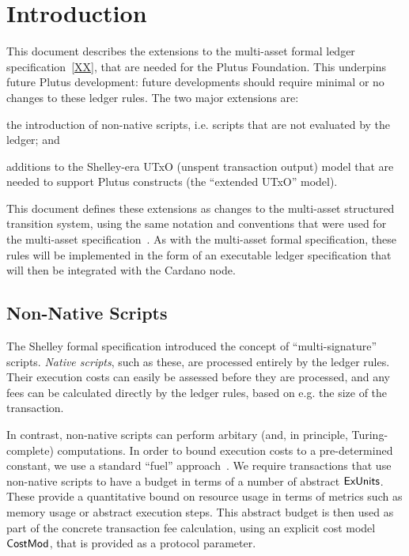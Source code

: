 \section{Introduction}

This document describes the extensions to the multi-asset formal ledger specification~\ref{XX},
that are needed for the Plutus Foundation.  This underpins future Plutus development: future developments should require minimal or no changes to these ledger rules.
%
The two major extensions are:
\begin{inparaenum}
\item
the introduction
of non-native scripts, i.e. scripts that are not evaluated by the ledger; and
\item
  additions to the Shelley-era UTxO (unspent transaction output) model that are needed to support Plutus
  constructs (the ``extended UTxO'' model).
\end{inparaenum}
This document defines these extensions as changes to the multi-asset structured transition system,
using the same notation and conventions that were used for the multi-asset specification~\cite{XX}.
As with the multi-asset formal specification, these rules will be implemented in the form of an executable ledger specification that will then be
integrated with the Cardano node.

\subsection{Non-Native Scripts}

The Shelley formal specification introduced the concept of ``multi-signature'' scripts.
\emph{Native scripts}, such as these, are processed entirely by the ledger rules.
Their execution costs can easily be assessed before they are processed,
and any fees can be calculated directly by the ledger rules, based on e.g. the
size of the transaction.

In contrast, non-native scripts can perform arbitary
(and, in principle, Turing-complete) computations.
In order to bound execution costs to a pre-determined constant, we use a standard ``fuel'' approach~\cite{XX}.
We require transactions that use non-native scripts
to have a budget in terms of a number of abstract $\mathsf{ExUnits}$.
These provide a quantitative bound on resource usage in terms of metrics such as memory usage or abstract execution steps.
This abstract budget is then used as part of the concrete transaction fee calculation, using an explicit
cost model $\mathsf{CostMod}$, that is provided as a protocol parameter.

